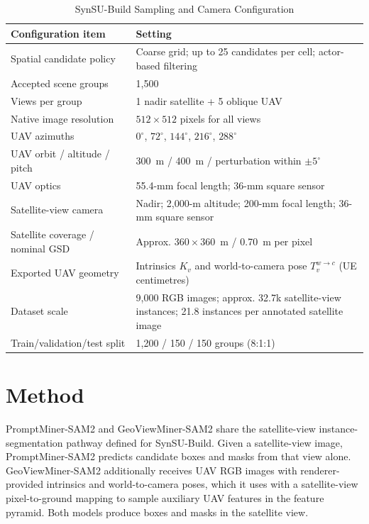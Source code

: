 \documentclass[letterpaper,journal]{IEEEtran}
\begin{document}
\begin{table}[!t]
\caption{SynSU-Build Sampling and Camera Configuration}
\label{tab:synsu_configuration}
\centering
\footnotesize
\setlength{\tabcolsep}{4pt}
\renewcommand{\arraystretch}{1.06}
\begin{tabular}{p{}p{}}
\toprule
Configuration item & Setting \\
\midrule
Spatial candidate policy & Coarse grid; up to 25 candidates per cell; actor-based filtering \\
Accepted scene groups & 1,500 \\
Views per group & 1 nadir satellite + 5 oblique UAV \\
Native image resolution & $512\times512$ pixels for all views \\
UAV azimuths & $0^{\circ}$, $72^{\circ}$, $144^{\circ}$, $216^{\circ}$, $288^{\circ}$ \\
UAV orbit / altitude / pitch & 300~m / 400~m / perturbation within $\pm5^{\circ}$ \\
UAV optics & 55.4-mm focal length; 36-mm square sensor \\
Satellite-view camera & Nadir; 2,000-m altitude; 200-mm focal length; 36-mm square sensor \\
Satellite coverage / nominal GSD & Approx. $360\times360$~m / 0.70~m per pixel \\
Exported UAV geometry & Intrinsics $K_v$ and world-to-camera pose $T_v^{w\rightarrow c}$ (UE centimetres) \\
Dataset scale & 9,000 RGB images; approx. 32.7k satellite-view instances; 21.8 instances per annotated satellite image \\
Train/validation/test split & 1,200 / 150 / 150 groups (8:1:1) \\
\bottomrule
\end{tabular}
\end{table}

\section{Method}
\label{sec:method}

PromptMiner-SAM2 and GeoViewMiner-SAM2 share the satellite-view instance-segmentation pathway
defined for SynSU-Build. Given a satellite-view image, PromptMiner-SAM2 predicts candidate boxes
and masks from that view alone. GeoViewMiner-SAM2 additionally receives UAV RGB images with
renderer-provided intrinsics and world-to-camera poses, which it uses with a satellite-view
pixel-to-ground mapping to sample auxiliary UAV features in the feature pyramid. Both models
produce boxes and masks in the satellite view.
\end{document}
